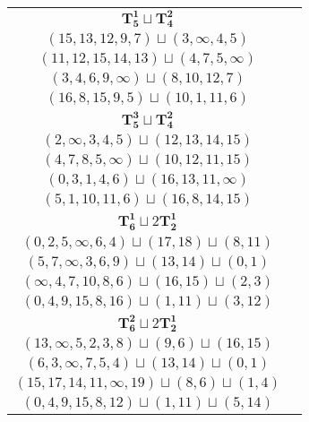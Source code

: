 \documentclass{article}
\begin{document}
\begin{longtable}{|c|c|}
        \hline
        $\mathbf{T_{5}^{1}} \sqcup \mathbf{T_{4}^{2}}$ & \begin{tabular}{c}
        $(10,13,\infty,8,11)\sqcup(1,2,3,4)$ \\ 
        $(15,13,12,9,7)\sqcup(3,\infty,4,5)$ \\ 
        $(11,12,15,14,13)\sqcup(4,7,5,\infty)$ \\ 
        $(3,4,6,9,\infty)\sqcup(8,10,12,7)$ \\ 
        $(16,8,15,9,5)\sqcup(10,1,11,6)$
        \end{tabular} \\ 
        \hline
        $\mathbf{T_{5}^{3}} \sqcup \mathbf{T_{4}^{2}}$ & \begin{tabular}{c}
        $(0,2,3,4,5)\sqcup(9,8,11,\infty)$ \\ 
        $(2,\infty,3,4,5)\sqcup(12,13,14,15)$ \\ 
        $(4,7,8,5,\infty)\sqcup(10,12,11,15)$ \\ 
        $(0,3,1,4,6)\sqcup(16,13,11,\infty)$ \\ 
        $(5,1,10,11,6)\sqcup(16,8,14,15)$
        \end{tabular} \\ 
        \hline
        $\mathbf{T_{6}^{1}} \sqcup 2\mathbf{T_{2}^{1}}$ & \begin{tabular}{c}
        $(3,5,4,2,\infty,1)\sqcup(19,20)\sqcup(12,15)$ \\ 
        $(0,2,5,\infty,6,4)\sqcup(17,18)\sqcup(8,11)$ \\ 
        $(5,7,\infty,3,6,9)\sqcup(13,14)\sqcup(0,1)$ \\ 
        $(\infty,4,7,10,8,6)\sqcup(16,15)\sqcup(2,3)$ \\ 
        $(0,4,9,15,8,16)\sqcup(1,11)\sqcup(3,12)$
        \end{tabular} \\ 
        \hline
        $\mathbf{T_{6}^{2}} \sqcup 2\mathbf{T_{2}^{1}}$ & \begin{tabular}{c}
        $(\infty,2,4,5,8,0)\sqcup(18,20)\sqcup(12,13)$ \\ 
        $(13,\infty,5,2,3,8)\sqcup(9,6)\sqcup(16,15)$ \\ 
        $(6,3,\infty,7,5,4)\sqcup(13,14)\sqcup(0,1)$ \\ 
        $(15,17,14,11,\infty,19)\sqcup(8,6)\sqcup(1,4)$ \\ 
        $(0,4,9,15,8,12)\sqcup(1,11)\sqcup(5,14)$
        \end{tabular} \\ 

\end{longtable}
\end{document}
